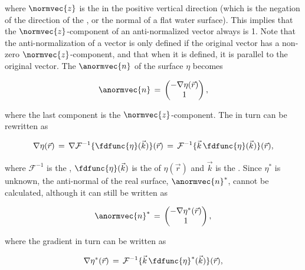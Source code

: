 where $\normvec{z}$ is the  in the positive vertical direction (which is the negation of the direction of the , or the normal of a flat water surface). This implies that the $\normvec{z}$-component of an anti-normalized vector always is 1. Note that the anti-normalization of a vector is only defined if the original vector has a non-zero $\normvec{z}$-component, and that when it is defined, it is parallel to the original vector. The  $\anormvec{n}$ of the surface $\eta$ becomes

\begin{equation} \label{eq:anti_normal_from_gradient}
\anormvec{n} \,=\, \left(\!\!\!\begin{array}{c}-\nabla\eta(\vec{r}) \\ 1\end{array}\!\!\!\right),
\end{equation}

where the last component is the $\normvec{z}$-component. The \gradient in turn can be rewritten as

\begin{equation}
\nabla\eta(\vec{r}) \,=\, \nabla\mathcal{F}^{-1}\{\fdfunc{\eta}(\vec{k})\}(\vec{r}) \,=\, \mathcal{F}^{-1}\{\vec{k}\,\fdfunc{\eta}(\vec{k})\}(\vec{r}),
\end{equation}

where $\mathcal{F}^{-1}$ is the , $\fdfunc{\eta}(\vec{k})$ is the  of $\eta(\vec{r})$ and $\vec{k}$ is the . Since $\eta^*$ is unknown, the anti-normal of the real surface, $\anormvec{n}^*$, cannot be calculated, although it can still be written as

\begin{equation} \label{eq:eta_anti_normal}
\anormvec{n}^* \,=\, \left(\!\!\!\begin{array}{c}-\nabla\eta^*(\vec{r}) \\ 1\end{array}\!\!\!\right),
\end{equation}

where the gradient in turn can be written as

\begin{equation}
\nabla\eta^*(\vec{r}) \,=\, \mathcal{F}^{-1}\{\vec{k}\,\fdfunc{\eta}^*(\vec{k})\}(\vec{r}),
\end{equation}

